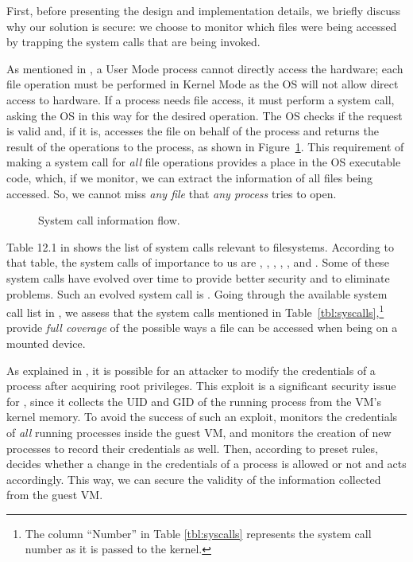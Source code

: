\par First, before presenting the design and implementation details, we briefly discuss why our solution is secure: we choose to monitor which files were being accessed by trapping the system calls that are being invoked. 

\par As mentioned in \cite{linuxkernel}, a User Mode process cannot directly access the hardware; each file operation must be performed in Kernel Mode as the \ac{OS} will not allow direct access to hardware. If a process needs file access, it must perform a system call, asking the \ac{OS} in this way for the desired operation. The \ac{OS} checks if the request is valid and, if it is, accesses the file on behalf of the process and returns the result of the operations to the process, as shown in Figure~\ref{fig:syscall}. This requirement of making a system call for \emph{all} file operations provides a place in the \ac{OS} executable code, which, if we monitor, we can extract the information of all files being accessed. So, we cannot miss \emph{any file} that \emph{any process} tries to open.

\begin{figure}[ht]
	\centering
	
	\caption{System call information flow.}
	\label{fig:syscall}
\end{figure}

\par Table 12.1 in \cite{linuxkernel} shows the list of system calls relevant to filesystems. According to that table, the system calls of importance to us are , , , , , and . Some of these system calls have evolved over time to provide better security and to eliminate problems. Such an evolved system call is . Going through the available system call list in , we assess that the system calls mentioned in Table~\ref{tbl:syscalls},\footnote{The column ``Number'' in Table \ref{tbl:syscalls} represents the system call number as it is passed to the kernel.} provide \emph{full coverage} of the possible ways a file can be accessed when being on a mounted device. 

\par As explained in \cite{perla2010guide}, it is possible for an attacker to modify the credentials of a process after acquiring root privileges. This exploit is a significant security issue for , since it collects the \ac{UID} and \ac{GID} of the running process from the \ac{VM}'s kernel memory. To avoid the success of such an exploit,  monitors the credentials of \emph{all} running processes inside the guest \ac{VM}, and monitors the creation of new processes to record their credentials as well. Then, according to preset rules,  decides whether a change in the credentials of a process is allowed or not and acts accordingly. This way, we can secure the validity of the information collected from the guest \ac{VM}.



